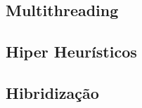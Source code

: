 \subsection{Multithreading}
\lipsum[2]

\subsection{Hiper Heurísticos}
\lipsum[2]

\subsection{Hibridização}
\lipsum[2]

